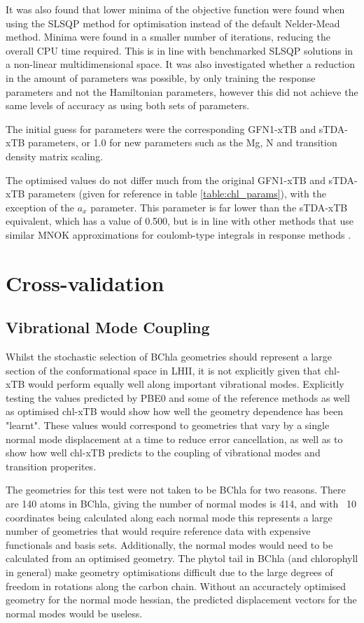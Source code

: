 It was also found that lower minima of the objective function were found when using
the SLSQP method for optimisation instead of the default Nelder-Mead method. Minima
were found in a smaller number of iterations, reducing the overall CPU time required.
This is in line with benchmarked SLSQP solutions in a non-linear multidimensional space.
It was also investigated whether a reduction in the amount of parameters was possible,
by only training the response parameters and not the Hamiltonian parameters, however 
this did not achieve the same levels of accuracy as using both sets of parameters.

The initial guess for parameters were the corresponding GFN1-xTB and sTDA-xTB
parameters, or 1.0 for new parameters such as the Mg, N and transition density matrix
scaling.

The optimised values do not differ much from the original GFN1-xTB and sTDA-xTB
parameters (given for reference in table \ref{table:chl_params}), with the exception
of the $a_x$ parameter. This parameter is far lower than the sTDA-xTB equivalent,
which has a value of 0.500, but is in line with other methods that use similar MNOK
approximations for coulomb-type integrals in response methods \cite{Cho2021}.

\afterpartskip
\section{Cross-validation}
\label{sec:chl_benchmarking}

\subsection{Vibrational Mode Coupling}
\label{subsec:pot_energy_surfaces}

Whilst the stochastic selection of BChla geometries should represent a large section 
of the conformational space in LHII, it is not explicitly given that chl-xTB would
perform equally well along important vibrational modes. Explicitly testing the
values predicted by PBE0 and some of the reference methods as well as optimised
chl-xTB would show how well the geometry dependence has been "learnt". These values
would correspond to geometries that vary by a single normal mode displacement at 
a time to reduce error cancellation, as well as to show how well chl-xTB predicts
to the coupling of vibrational modes and transition properites.

The geometries for this test were not taken to be BChla for two reasons. There are
140 atoms in BChla, giving the number of normal modes is 414, and with ~10 coordinates
being calculated along each normal mode this represents a large number of geometries
that would require reference data with expensive functionals and basis sets. Additionally,
the normal modes would need to be calculated from an optimised geometry. The phytol
tail in BChla (and chlorophyll in general) make geometry optimisations difficult
due to the large degrees of freedom in rotations along the carbon chain. Without
an accuractely optimised geometry for the normal mode hessian, the predicted displacement
vectors for the normal modes would be useless.


